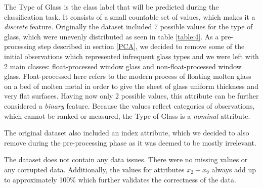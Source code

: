 \documentclass[12pt]{article}
\begin{document}
The Type of Glass is the class label that will be predicted during the classification task. It consists of a small countable set of values, which makes it a \textit{discrete} feature. Originally the dataset included 7 possible values for the type of glass, which were unevenly distributed as seen in table \ref{table:4}. As a pre-processing step described in section \ref{PCA}, we decided to remove some of the initial observations which represented infrequent glass types and we were left with 2 main classes: float-processed window glass and non-float-processed window glass.
Float-processed here refers to the modern process of floating molten glass on a bed of molten metal in order to give the sheet of glass uniform thickness and very flat surfaces. Having now only 2 possible values, this attribute can be further considered a \textit{binary} feature. Because the values reflect categories of observations, which cannot be ranked or measured, the Type of Glass is a \textit{nominal} attribute.

The original dataset also included an index attribute, which we decided to also remove during the pre-processing phase as it was deemed to be mostly irrelevant.

The dataset does not contain any data issues. There were no missing values or any corrupted data. Additionally, the values for attributes $ x_{2}-x_{9} $ always add up to approximately 100\% which further validates the correctness of the data.
\end{document}
